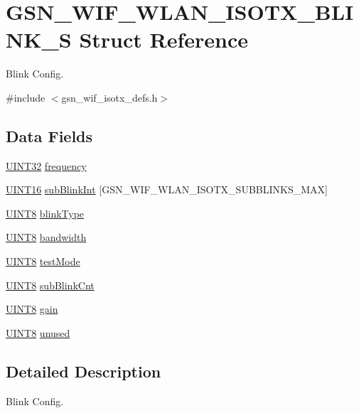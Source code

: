 \hypertarget{a00383}{
\section{GSN\_\-WIF\_\-WLAN\_\-ISOTX\_\-BLINK\_\-S Struct Reference}
\label{a00383}
}


Blink Config.  




{\ttfamily \#include $<$gsn\_\-wif\_\-isotx\_\-defs.h$>$}

\subsection*{Data Fields}
\begin{DoxyCompactItemize}
\item 
\hyperlink{a00660_gae1e6edbbc26d6fbc71a90190d0266018}{UINT32} \hyperlink{a00383_a52991657866650aa21f85b97e7d9168c}{frequency}
\item 
\hyperlink{a00660_ga09f1a1fb2293e33483cc8d44aefb1eb1}{UINT16} \hyperlink{a00383_a89c9e515e07a8cb3a9acea911fbd1c27}{subBlinkInt} \mbox{[}GSN\_\-WIF\_\-WLAN\_\-ISOTX\_\-SUBBLINKS\_\-MAX\mbox{]}
\item 
\hyperlink{a00660_gab27e9918b538ce9d8ca692479b375b6a}{UINT8} \hyperlink{a00383_a2136113b2c79a3867262b1f57e8bcb08}{blinkType}
\item 
\hyperlink{a00660_gab27e9918b538ce9d8ca692479b375b6a}{UINT8} \hyperlink{a00383_a548d910b6340cf4de833a896da2b35f6}{bandwidth}
\item 
\hyperlink{a00660_gab27e9918b538ce9d8ca692479b375b6a}{UINT8} \hyperlink{a00383_aecbbfdda9c54e1709aded6b98eea4689}{testMode}
\item 
\hyperlink{a00660_gab27e9918b538ce9d8ca692479b375b6a}{UINT8} \hyperlink{a00383_a7401ef0cfcbfa58025bfb197a472ff12}{subBlinkCnt}
\item 
\hyperlink{a00660_gab27e9918b538ce9d8ca692479b375b6a}{UINT8} \hyperlink{a00383_a0f1b5772403f7bc9104194ca13b98ef4}{gain}
\item 
\hyperlink{a00660_gab27e9918b538ce9d8ca692479b375b6a}{UINT8} \hyperlink{a00383_a04efd61f68d1dcc6739211e703576ea7}{unused}
\end{DoxyCompactItemize}


\subsection{Detailed Description}
Blink Config. 

